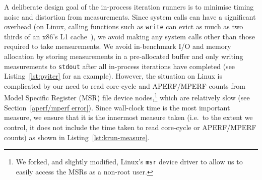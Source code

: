\documentclass[acmsmall,screen]{acmart}
\begin{document}
A deliberate design goal of the in-process iteration runners is to minimise
timing noise and distortion from measurements. Since system calls can have a
significant overhead (on Linux, calling functions such as \texttt{write} can
evict as much as two thirds of an x86's L1 cache~\cite{soares10flexsc}), we
avoid making any system calls other than those required to take measurements. We
avoid in-benchmark I/O and memory allocation by storing measurements in a
pre-allocated buffer and only writing measurements to \texttt{stdout} after all
in-process iterations have completed (see Listing~\ref{lst:pyiter} for an
example). However, the situation on Linux is complicated by our need to read
core-cycle and APERF/MPERF counts from Model Specific Register (MSR) file device
nodes,\footnote{We forked, and slightly modified, Linux's \texttt{msr} device
driver to allow us to easily access the MSRs as a non-root user.} which are relatively
slow (see Section~\ref{aperf/mperf error}). Since wall-clock time
is the most important measure, we ensure that it is the innermost measure taken
(i.e.~to the extent we control, it does not include the time taken to read
core-cycle or APERF/MPERF counts) as shown in Listing~\ref{lst:krun-measure}.
\end{document}
